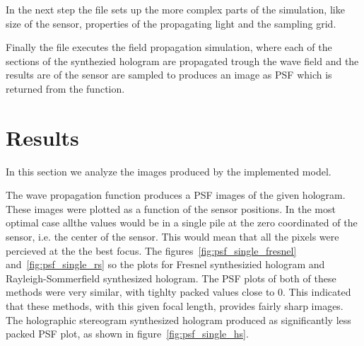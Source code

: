 \documentclass[12pt,a4paper,english
]{tunithesis}
\begin{document}
In the next step the file sets up the more complex parts of the simulation, like size of the sensor, properties of the propagating light and the sampling grid.

Finally the file executes the field propagation simulation, where each of the sections of the synthezied hologram are propagated trough the wave field and the results are of the sensor are sampled to produces an image as PSF which is returned from the function.


\chapter{Results}
\label{sec:results}
In this section we analyze the images produced by the implemented model.

The wave propagation function produces a PSF images of the given hologram. These images were plotted as a function of the sensor positions. In the most optimal case allthe values would be in a single pile at the zero coordinated of the sensor, i.e. the center of the sensor. This would mean that all the pixels were percieved at the the best focus. The figures~\ref{fig:psf_single_fresnel} and~\ref{fig:psf_single_rs} so the plots for Fresnel synthesizied hologram and Rayleigh-Sommerfield synthesized hologram. The PSF plots of both of these methods were very similar, with tighlty packed values close to 0. This indicated that these methods, with this given focal length, provides fairly sharp images. The holographic stereogram synthesized hologram produced as significantly less packed PSF plot, as shown in figure~\ref{fig:psf_single_hs}.
\end{document}
